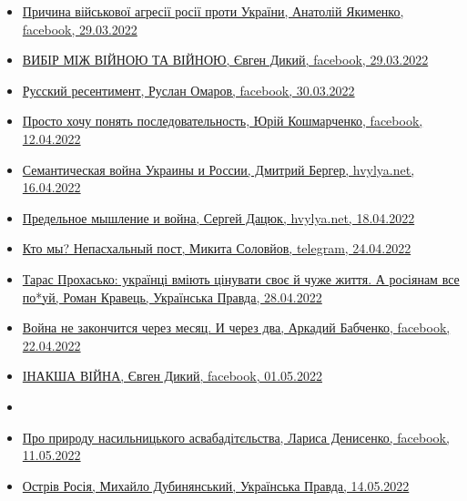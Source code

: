 \begin{itemize} %

\item \hyperlink{29_03_2022.fb.jakimenko_anatolij.1.prichina_agressii}{%
Причина військової агресії росії проти України, Анатолій Якименко, facebook, 29.03.2022%
}

\item \hyperlink{29_03_2022.fb.dykyj_evgen.1.vijna_vijna}{%
ВИБІР МІЖ ВІЙНОЮ ТА ВІЙНОЮ, Євген Дикий, facebook, 29.03.2022%
}

\item \hyperlink{30_03_2022.fb.omarov_ruslan.1.russkij_ressentiment}{%
Русский ресентимент, Руслан Омаров, facebook, 30.03.2022%
}

\item \hyperlink{12_04_2022.fb.koshmarchenko_jurij.1.posledovatelnost}{%
Просто хочу понять последовательность, Юрій Кошмарченко, facebook, 12.04.2022%
}

\item \hyperlink{16_04_2022.stz.news.ua.hvylya.1.semantic_war_ukrros}{%
Семантическая война Украины и России, Дмитрий Бергер, hvylya.net, 16.04.2022
}

\item \hyperlink{18_04_2022.stz.news.ua.hvylya.1.predelnoje_myshlenie_i_vojna}{%
Предельное мышление и война, Сергей Дацюк, hvylya.net, 18.04.2022%
}

\item \hyperlink{24_04_2022.tg.solovjov_mikita.harkov.demsokyra.1.kto_my_nepashalnyj_post}{%
Кто мы? Непасхальный пост, Микита Соловйов, telegram, 24.04.2022%
}

\item \hyperlink{28_04_2022.stz.news.ua.pravda.1.prohasjko_rossiane_pohuj}{%
Тарас Прохасько: українці вміють цінувати своє й чуже життя. А росіянам все по*уй, %
Роман Кравець, Українська Правда, 28.04.2022%
}


\item \hyperlink{22_04_2022.fb.babchenko_arkadii.1.vojna_ne_zakonchitsja}{%
Война не закончится через месяц. И через два, Аркадий Бабченко, facebook, 22.04.2022%
}


\item \hyperlink{01_05_2022.fb.dykyj_evgen.1.inaksha_vijna}{%
ІНАКША ВІЙНА, Євген Дикий, facebook, 01.05.2022%
}

\item \hyperlink{09_05_2022.fb.ohotin_petro.1.zorjanyj_chas_ukrainy}{%
}

\item \hyperlink{11_05_2022.fb.denysenko_larysa.1.nasilnik_osvoboditel}{%
Про природу насильницького асвабадітєльства, Лариса Денисенко, facebook, 11.05.2022%
}

\item \hyperlink{14_05_2022.stz.news.ua.pravda.1.ostriv_rosia}{%
Острів Росія, Михайло Дубинянський, Українська Правда, 14.05.2022%
}



\end{itemize} %
